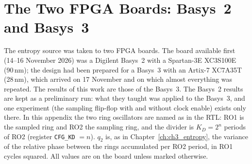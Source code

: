 
\chapter{The Two FPGA Boards: Basys~2 and Basys~3}
\label{app:fpga}

The entropy source was taken to two \ac{FPGA} boards. The board available
first (14--16 November 2026) was a Digilent Basys~2 with a Spartan-3E
XC3S100E (90\,nm); the design had been prepared for a Basys~3 with an
Artix-7 XC7A35T (28\,nm), which arrived on 17 November and on which almost
everything was repeated. The results of this work are those of the
Basys~3. The Basys~2 results are kept as a preliminary run: what they
taught was applied to the Basys~3, and one experiment (the sampling
flip-flop with and without clock enable) exists only there. In this
appendix the two ring oscillators are named as in the \ac{RTL}: RO1 is the
sampled ring and RO2 the sampling ring, and the divider is
$K_D = 2^{n}$ periods of RO2 (register \texttt{CFG\_KD} $= n$). $q_2$ is, as in
Chapter~\ref{ch:ch3_entropy}, the variance of the relative phase between
the rings accumulated per RO2 period, in RO1 cycles squared. All values are \meas{} on the board unless
marked otherwise.

